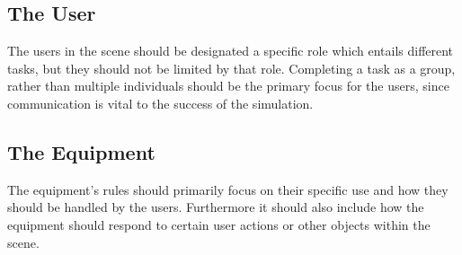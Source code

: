 \documentclass[paper=a4, fontsize=11pt]{scrartcl} %
\numberwithin{equation}{section} %
\numberwithin{figure}{section} %
\numberwithin{table}{section} %
\begin{document}
\subsection{The User}
The users in the scene should be designated a specific role which entails different tasks, but they should not be limited by that role. Completing a task as a group, rather than multiple individuals should be the primary focus for the users, since communication is vital to the success of the simulation.

\subsection{The Equipment}
The equipment's rules should primarily focus on their specific use and how they should be handled by the users. Furthermore it should also include how the equipment should respond to certain user actions or other objects within the scene.

\end{document}
